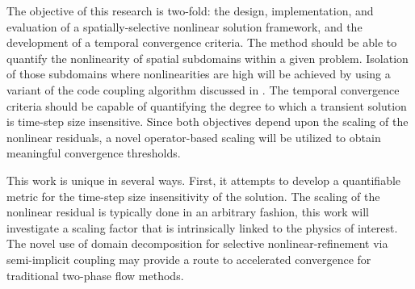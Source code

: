 The objective of this research is two-fold: the design, implementation, and evaluation of a spatially-selective nonlinear solution framework, and the development of a temporal convergence criteria.
The method should be able to quantify the nonlinearity of spatial subdomains within a given problem.
Isolation of those subdomains where nonlinearities are high will be achieved by using a variant of the code coupling algorithm discussed in .
The temporal convergence criteria should be capable of quantifying the degree to which a transient solution is time-step size insensitive.
Since both objectives depend upon the scaling of the nonlinear residuals, a novel operator-based scaling will be utilized to obtain meaningful convergence thresholds.

This work is unique in several ways.
First, it attempts to develop a quantifiable metric for the time-step size insensitivity of the solution.
The scaling of the nonlinear residual is typically done in an arbitrary fashion, this work will investigate a scaling factor that is intrinsically linked to the physics of interest.
The novel use of domain decomposition for selective nonlinear-refinement via semi-implicit coupling may provide a route to accelerated convergence for traditional two-phase flow methods.
